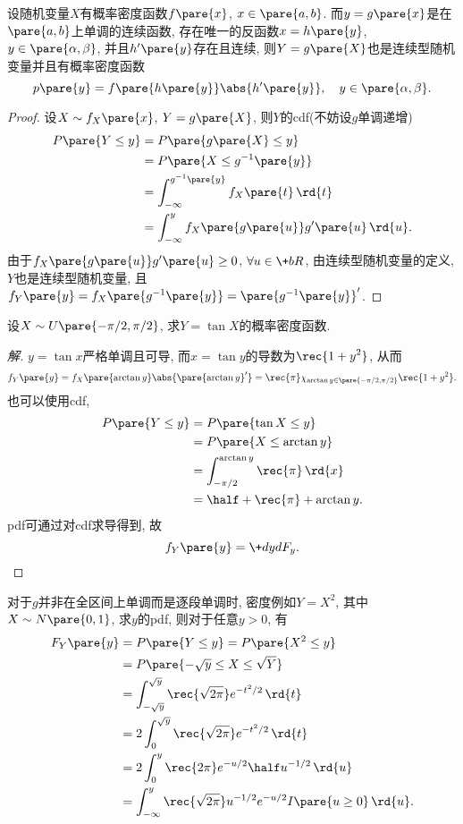 \documentclass{ctexart}
\begin{document}
\begin{theorem}[密度变换公式]
    设随机变量$X$有概率密度函数$f\pare{x}$, $x\in \pare{a,b}$. 而$y=g\pare{x}$是在$\pare{a,b}$上单调的连续函数, 存在唯一的反函数$x = h\pare{y}$, $y\in \pare{\alpha,\beta}$, 并且$h'\pare{y}$存在且连续, 则$Y=g\pare{X}$也是连续型随机变量并且有概率密度函数
    \[ p\pare{y} = f\pare{h\pare{y}}\abs{h'\pare{y}},\quad y\in\pare{\alpha,\beta}. \]
\end{theorem}
\begin{proof}
    设$X\sim f_X\pare{x}$, $Y = g\pare{X}$, 则$Y$的cdf(不妨设$g$单调递增)
    \begin{align*}
        P\pare{Y\le y} &= P\pare{g\pare{X} \le y} \\
        &= P\pare{X \le g^{-1}\pare{y}} \\
        &= \int_{-\infty}^{g^{-1}\pare{y}}f_X\pare{t}\,\rd{t} \\
        &= \int_{-\infty}^y f_X\pare{g\pare{u}}g'\pare{u}\,\rd{u}.
    \end{align*}
    由于$f_X\pare{g\pare{u}}g'\pare{u}\ge 0$, $\forall u\in \+bR$, 由连续型随机变量的定义, $Y$也是连续型随机变量, 且$f_Y\pare{y} = f_X\pare{g^{-1}\pare{y}} = \pare{g^{-1}\pare{y}}'$.
\end{proof}
\begin{sample}
    \begin{ex}
        设$X\sim U\pare{-\pi/2,\pi/2}$, 求$Y=\tan X$的概率密度函数.
    \end{ex}
    \begin{proof}[解]
        $y=\tan x$严格单调且可导, 而$x=\tan y$的导数为$\displaystyle \rec{1+y^2}$, 从而
        \[ f_Y\pare{y} = f_X\pare{\arctan y}\abs{\pare{\arctan y}'} = \rec{\pi} \chi_{\arctan y \in \pare{-\pi/2,\pi/2}}\rec{1+y^2}. \]
        也可以使用cdf,
        \begin{align*}
            P\pare{Y\le y} &= P\pare{\tan X \le y} \\
            &= P\pare{X\le \arctan y} \\
            &= \int_{-\pi/2}^{\arctan y}\rec{\pi}\,\rd{x} \\
            &= \half + \rec{\pi}+\arctan y.
        \end{align*}
        pdf可通过对cdf求导得到, 故
        \[ f_Y\pare{y} = \+dyd{F_y}. \qedhere \]
    \end{proof}
\end{sample}
对于$g$并非在全区间上单调而是逐段单调时, 密度例如$Y=X^2$, 其中$X\sim N\pare{0,1}$, 求$y$的pdf, 则对于任意$y>0$, 有
\begin{align*}
    F_Y\pare{y} &= P\pare{Y\le y} = P\pare{X^2 \le y} \\
    &= P\pare{-\sqrt{y} \le X \le \sqrt{Y}} \\
    &= \int_{-\sqrt{y}}^{\sqrt{y}} \rec{\sqrt{2\pi}} e^{-t^2/2}\,\rd{t} \\
    &= 2 \int_0^{\sqrt{y}} \rec{\sqrt{2\pi}}e^{-t^2/2}\,\rd{t} \\
    &= 2 \int_0^y \rec{2\pi} e^{-u/2} \half u^{-1/2}\,\rd{u} \\
    &= \int_{-\infty}^y \rec{\sqrt{2\pi}} u^{-1/2}e^{-u/2}I\pare{u\ge 0}\,\rd{u}.
\end{align*}
\end{document}
